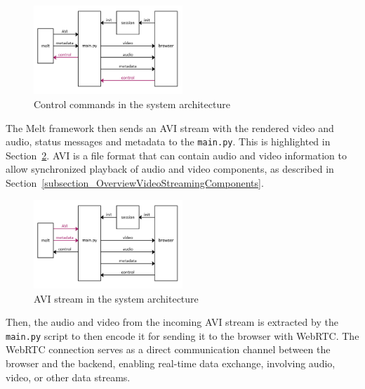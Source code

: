 \documentclass[../MasterThesis.tex]{subfiles}
\begin{document}
\begin{figure}[H]
	\centering
	\includegraphics[width=0.5\textwidth]{IM_control.png}
	\caption{Control commands in the system architecture}
	\label{figure:controlcommands}
\end{figure}


The Melt framework then sends an AVI stream with the rendered video and audio, status messages and metadata to the \texttt{main.py}. This is highlighted in Section~\ref{figure:avimetadata}.
AVI is a file format that can contain audio and video information to allow synchronized playback of audio and video components, as described in Section~\ref{subsection_OverviewVideoStreamingComponents}.~\cite{avi} 

\begin{figure}[H]
	\centering
	\includegraphics[width=0.5\textwidth]{IM_avi.png}
	\caption{AVI stream in the system architecture}
	\label{figure:avimetadata}
\end{figure}


Then, the audio and video from the incoming AVI stream is extracted by the \texttt{main.py} script to then encode it for sending it to the browser with WebRTC. The WebRTC connection serves as a direct communication channel between the browser and the backend, enabling real-time data exchange, involving audio, video, or other data streams. 


%
\end{document}
